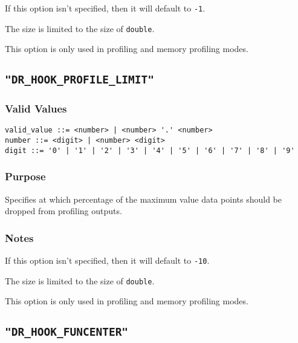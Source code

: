 If this option isn't specified, then it will default to \verb|-1|.

The size is limited to the size of \verb|double|.

This option is only used in profiling and memory profiling modes.



\subsection{\texttt{"DR\_HOOK\_PROFILE\_LIMIT"}}
\label{section:flags:DR_HOOK_PROFILE_LIMIT}
\vspace{-2ex}
\subsubsection{Valid Values}
\vspace{-2ex}
\verb+valid_value ::= <number> | <number> '.' <number> + \\
\verb+number ::= <digit> | <number> <digit>+ \\
\verb+digit ::= '0' | '1' | '2' | '3' | '4' | '5' | '6' | '7' | '8' | '9'+

\vspace{-2ex}
\subsubsection{Purpose}
\vspace{-2ex}
Specifies at which percentage of the maximum value data points should be dropped from profiling outputs.

\vspace{-2ex}
\subsubsection{Notes}
\vspace{-2ex}
If this option isn't specified, then it will default to \verb|-10|.

The size is limited to the size of \verb|double|.

This option is only used in profiling and memory profiling modes.


\subsection{\texttt{"DR\_HOOK\_FUNCENTER"}}
\label{section:flags:DR_HOOK_FUNCENTER}
\vspace{-2ex}
